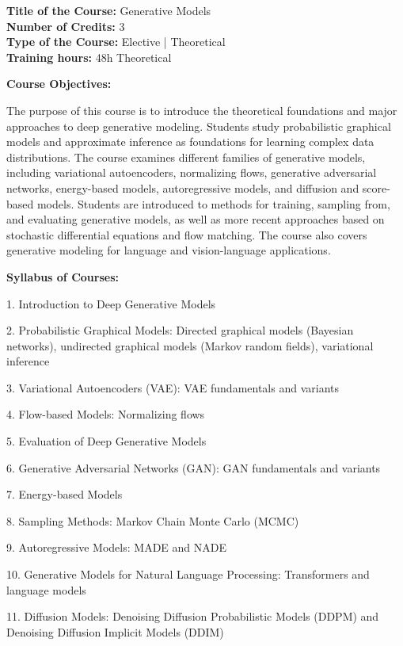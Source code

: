 \documentclass[12pt,a4paper]{article}
\begin{document}
\newpage
\textbf{Title of the Course:} Generative Models\\
\textbf{Number of Credits:} 3\\
\textbf{Type of the Course:} Elective | Theoretical\\
\textbf{Training hours:} 48h Theoretical\par\vspace{4pt}
\textbf{Course Objectives:}\par\vspace{2pt}
The purpose of this course is to introduce the theoretical foundations and major approaches to deep generative modeling. Students study probabilistic graphical models and approximate inference as foundations for learning complex data distributions. The course examines different families of generative models, including variational autoencoders, normalizing flows, generative adversarial networks, energy-based models, autoregressive models, and diffusion and score-based models. Students are introduced to methods for training, sampling from, and evaluating generative models, as well as more recent approaches based on stochastic differential equations and flow matching. The course also covers generative modeling for language and vision-language applications.\par\vspace{4pt}
\textbf{Syllabus of Courses:}\par\vspace{2pt}
1. Introduction to Deep Generative Models\par
2. Probabilistic Graphical Models: Directed graphical models (Bayesian networks), undirected graphical models (Markov random fields), variational inference\par
3. Variational Autoencoders (VAE): VAE fundamentals and variants\par
4. Flow-based Models: Normalizing flows\par
5. Evaluation of Deep Generative Models\par
6. Generative Adversarial Networks (GAN): GAN fundamentals and variants\par
7. Energy-based Models\par
8. Sampling Methods: Markov Chain Monte Carlo (MCMC)\par
9. Autoregressive Models: MADE and NADE\par
10. Generative Models for Natural Language Processing: Transformers and language models\par
11. Diffusion Models: Denoising Diffusion Probabilistic Models (DDPM) and Denoising Diffusion Implicit Models (DDIM)\par
\end{document}
